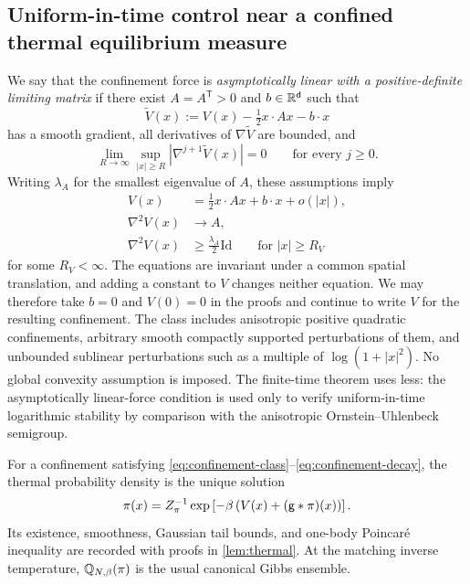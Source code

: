 \documentclass[11pt,reqno]{amsart}
\numberwithin{equation}{section}
\theoremstyle{plain}
\theoremstyle{remark}
\renewcommand{\d}{\mathsf{d}}\newcommand{\s}{\mathsf{s}}
\newcommand{\Id}{\mathrm{Id}}
\begin{document}
\subsection{Uniform-in-time control near a confined thermal equilibrium measure}
We say that the confinement force is \emph{asymptotically linear with a positive-definite limiting matrix} if there exist $A=A^{\mathsf T}>0$ and $b\in\R^\d$ such that
\begin{equation}\label{eq:confinement-class}
 \widetilde V(x):=V(x)-\tfrac12x\cdot Ax-b\cdot x
\end{equation}
has a smooth gradient, all derivatives of $\nabla\widetilde V$ are bounded, and
\begin{equation}\label{eq:confinement-decay}
 \lim_{R\to\infty}\sup_{|x|\ge R}|\nabla^{j+1}\widetilde V(x)|=0
 \qquad\text{for every }j\ge0.
\end{equation}
Writing $\lambda_A$ for the smallest eigenvalue of $A$, these assumptions imply
\begin{align}
 V(x)&=\frac12x\cdot Ax+b\cdot x+o(|x|),\label{eq:confinement-potential-asymptotic}\\
 \nabla^2V(x)&\longrightarrow A,\label{eq:confinement-hessian-asymptotic}\\
 \nabla^2V(x)&\ge\frac{\lambda_A}{2}\Id\qquad\text{for }|x|\ge R_V
 \label{eq:exterior-curvature}
\end{align}
for some $R_V<\infty$. The equations are invariant under a common spatial translation, and adding a constant to $V$ changes neither equation. {We may therefore take $b=0$ and $V(0)=0$ in the proofs and continue to write $V$ for the resulting confinement.} The class includes anisotropic positive quadratic confinements, arbitrary smooth compactly supported perturbations of them, and unbounded sublinear perturbations such as a multiple of $\log(1+|x|^2)$. No global convexity assumption is imposed. The finite-time theorem uses less: the asymptotically linear-force condition is used only to verify uniform-in-time logarithmic stability by comparison with the anisotropic Ornstein--Uhlenbeck semigroup.

For a confinement satisfying \eqref{eq:confinement-class}--\eqref{eq:confinement-decay}, the thermal probability density is the unique solution
\begin{equation}\label{eq:thermal}
 \pi(x)=Z_\pi^{-1}\exp\left[-\beta\left(V(x)+(\mathsf g*\pi)(x)\right)\right].
\end{equation}
Its existence, smoothness, Gaussian tail bounds, and one-body Poincar\'e inequality are recorded with proofs in \cref{lem:thermal}. At the matching inverse temperature, $\mathbb Q_{N,\beta}(\pi)$ is the usual canonical Gibbs ensemble.
\end{document}
